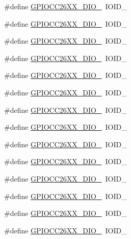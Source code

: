 \begin{DoxyCompactItemize}
\#define \hyperlink{_g_p_i_o_c_c26_x_x_8h_a77cd660fc81974b5aca40b71cf19b701}{G\+P\+I\+O\+C\+C26\+X\+X\+\_\+\+D\+I\+O\+\_}~I\+O\+I\+D\+\_
\item 
\#define \hyperlink{_g_p_i_o_c_c26_x_x_8h_ae43ad67feed2594fca16f728a4370a46}{G\+P\+I\+O\+C\+C26\+X\+X\+\_\+\+D\+I\+O\+\_}~I\+O\+I\+D\+\_
\item 
\#define \hyperlink{_g_p_i_o_c_c26_x_x_8h_a06c358d2a3dd7c8e1df95debdd05abdc}{G\+P\+I\+O\+C\+C26\+X\+X\+\_\+\+D\+I\+O\+\_}~I\+O\+I\+D\+\_
\item 
\#define \hyperlink{_g_p_i_o_c_c26_x_x_8h_adbdb48ba0c4442195218a9ddd47216e9}{G\+P\+I\+O\+C\+C26\+X\+X\+\_\+\+D\+I\+O\+\_}~I\+O\+I\+D\+\_
\item 
\#define \hyperlink{_g_p_i_o_c_c26_x_x_8h_a9f8e48d6505bab472f244bdd3a09d314}{G\+P\+I\+O\+C\+C26\+X\+X\+\_\+\+D\+I\+O\+\_}~I\+O\+I\+D\+\_
\item 
\#define \hyperlink{_g_p_i_o_c_c26_x_x_8h_a33f7040ad5310a2016da71d3f9d3a8b3}{G\+P\+I\+O\+C\+C26\+X\+X\+\_\+\+D\+I\+O\+\_}~I\+O\+I\+D\+\_
\item 
\#define \hyperlink{_g_p_i_o_c_c26_x_x_8h_aa0c0e910f6eb279b7ef816d80ddc57ca}{G\+P\+I\+O\+C\+C26\+X\+X\+\_\+\+D\+I\+O\+\_}~I\+O\+I\+D\+\_
\item 
\#define \hyperlink{_g_p_i_o_c_c26_x_x_8h_a16ef430a5c6fc095eae357ea0da9eae8}{G\+P\+I\+O\+C\+C26\+X\+X\+\_\+\+D\+I\+O\+\_}~I\+O\+I\+D\+\_
\item 
\#define \hyperlink{_g_p_i_o_c_c26_x_x_8h_aa8debefa14c291aae6934b4a1f9d2b33}{G\+P\+I\+O\+C\+C26\+X\+X\+\_\+\+D\+I\+O\+\_}~I\+O\+I\+D\+\_
\item 
\#define \hyperlink{_g_p_i_o_c_c26_x_x_8h_a27a107bace659fb5794f3006bf3fde2c}{G\+P\+I\+O\+C\+C26\+X\+X\+\_\+\+D\+I\+O\+\_}~I\+O\+I\+D\+\_
\item 
\#define \hyperlink{_g_p_i_o_c_c26_x_x_8h_a027e920b68bd09a64a98c88c7d5110f3}{G\+P\+I\+O\+C\+C26\+X\+X\+\_\+\+D\+I\+O\+\_}~I\+O\+I\+D\+\_
\item 
\#define \hyperlink{_g_p_i_o_c_c26_x_x_8h_add164676da3172dcd3ba7ec80398b638}{G\+P\+I\+O\+C\+C26\+X\+X\+\_\+\+D\+I\+O\+\_}~I\+O\+I\+D\+\_
\item 
\#define \hyperlink{_g_p_i_o_c_c26_x_x_8h_a2cb39452780504dff0188ef3ddd7e71e}{G\+P\+I\+O\+C\+C26\+X\+X\+\_\+\+D\+I\+O\+\_}~I\+O\+I\+D\+\_
\item 
\#define \hyperlink{_g_p_i_o_c_c26_x_x_8h_a07951649eb1fc0fef858161d04cfab9c}{G\+P\+I\+O\+C\+C26\+X\+X\+\_\+\+D\+I\+O\+\_}~I\+O\+I\+D\+\_

\end{DoxyCompactItemize}
